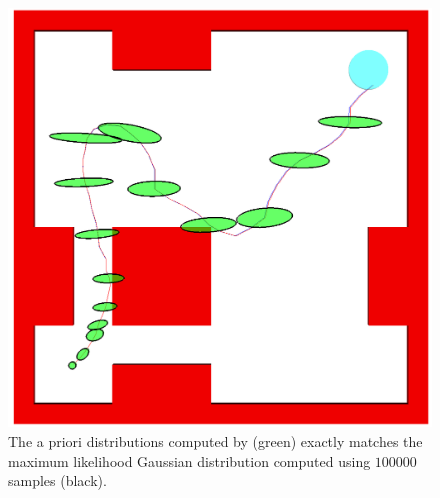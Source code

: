 \documentclass[letterpaper]{article}
\begin{document}
\begin{figure}[h]
\begin{center}
\includegraphics[width=0.49\linewidth]{figures/car-complex1.png}
\vspace{-20pt}
\end{center}
\caption{The a priori distributions computed by \cite{Bry11} (green) exactly matches the maximum likelihood Gaussian distribution computed using $100000$ samples (black). }
\label{fig:panel1}
\end{figure}
\end{document}
